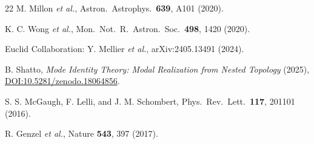 \documentclass[
    aps,
    prd,
    reprint,
    superscriptaddress,
    nofootinbib,
    floatfix
]{revtex4-2}
\begin{document}
\begin{thebibliography}{22}
M. Millon \emph{et al.},
Astron.\ Astrophys.\ \textbf{639}, A101 (2020).

K. C. Wong \emph{et al.},
Mon.\ Not.\ R.\ Astron.\ Soc.\ \textbf{498}, 1420 (2020).

Euclid Collaboration: Y. Mellier \emph{et al.},
arXiv:2405.13491 (2024).

B. Shatto, \emph{Mode Identity Theory: Modal Realization from
Nested Topology} (2025),
\href{https://doi.org/10.5281/zenodo.18064856}{DOI:10.5281/zenodo.18064856}.

S. S. McGaugh, F. Lelli, and J. M. Schombert,
Phys.\ Rev.\ Lett.\ \textbf{117}, 201101 (2016).

R. Genzel \emph{et al.}, Nature \textbf{543}, 397 (2017).

\end{thebibliography}
\end{document}
